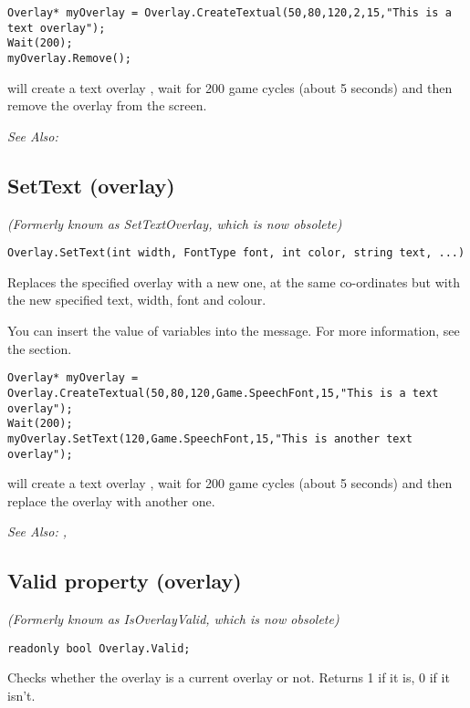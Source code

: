 \begin{verbatim}
Overlay* myOverlay = Overlay.CreateTextual(50,80,120,2,15,"This is a text overlay");
Wait(200);
myOverlay.Remove();
\end{verbatim}
will create a text overlay , wait for 200 game cycles (about 5 seconds) and then
remove the overlay from the screen.

\it{See Also:} 


\subsection{SetText (overlay)}\label{Overlay.SetText}%

\it{(Formerly known as SetTextOverlay, which is now obsolete)}

\begin{verbatim}
Overlay.SetText(int width, FontType font, int color, string text, ...)
\end{verbatim}
Replaces the specified overlay with a new one, at the same co-ordinates but with
the new specified text, width, font and colour.

You can insert the value of variables into the message. For more information,
see the  section.

\begin{verbatim}
Overlay* myOverlay = Overlay.CreateTextual(50,80,120,Game.SpeechFont,15,"This is a text overlay");
Wait(200);
myOverlay.SetText(120,Game.SpeechFont,15,"This is another text overlay");
\end{verbatim}
will create a text overlay , wait for 200 game cycles (about 5 seconds) and then
replace the overlay with another one.

\it{See Also:} ,


\subsection{Valid property (overlay)}\label{Overlay.Valid}%

\it{(Formerly known as IsOverlayValid, which is now obsolete)}

\begin{verbatim}
readonly bool Overlay.Valid;
\end{verbatim}
Checks whether the overlay is a current overlay or not.
Returns 1 if it is, 0 if it isn't.

